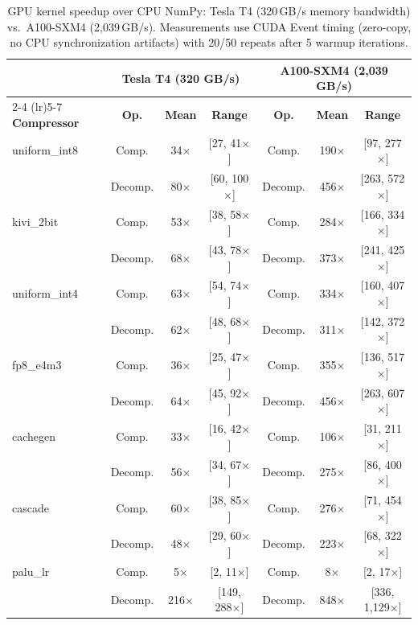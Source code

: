 \documentclass{article}
\begin{document}
\begin{table}[t]
\centering
\caption{GPU kernel speedup over CPU NumPy: Tesla T4 (320\,GB/s memory bandwidth) vs.\ A100-SXM4 (2{,}039\,GB/s). Measurements use CUDA Event timing (zero-copy, no CPU synchronization artifacts) with 20/50 repeats after 5 warmup iterations.}
\label{tab:gpu_speedup}
\small
\begin{tabular}{lcccccc}
\toprule
 & \multicolumn{3}{c}{\textbf{Tesla T4 (320 GB/s)}} & \multicolumn{3}{c}{\textbf{A100-SXM4 (2{,}039 GB/s)}} \\
\cmidrule(lr){2-4} \cmidrule(lr){5-7}
\textbf{Compressor} & \textbf{Op.} & \textbf{Mean} & \textbf{Range} & \textbf{Op.} & \textbf{Mean} & \textbf{Range} \\
\midrule
uniform\_int8 & Comp. & 34$\times$ & [27, 41$\times$] & Comp. & 190$\times$ & [97, 277$\times$] \\
 & Decomp. & 80$\times$ & [60, 100$\times$] & Decomp. & 456$\times$ & [263, 572$\times$] \\
\midrule
kivi\_2bit & Comp. & 53$\times$ & [38, 58$\times$] & Comp. & 284$\times$ & [166, 334$\times$] \\
 & Decomp. & 68$\times$ & [43, 78$\times$] & Decomp. & 373$\times$ & [241, 425$\times$] \\
\midrule
uniform\_int4 & Comp. & 63$\times$ & [54, 74$\times$] & Comp. & 334$\times$ & [160, 407$\times$] \\
 & Decomp. & 62$\times$ & [48, 68$\times$] & Decomp. & 311$\times$ & [142, 372$\times$] \\
\midrule
fp8\_e4m3 & Comp. & 36$\times$ & [25, 47$\times$] & Comp. & 355$\times$ & [136, 517$\times$] \\
 & Decomp. & 64$\times$ & [45, 92$\times$] & Decomp. & 456$\times$ & [263, 607$\times$] \\
\midrule
cachegen & Comp. & 33$\times$ & [16, 42$\times$] & Comp. & 106$\times$ & [31, 211$\times$] \\
 & Decomp. & 56$\times$ & [34, 67$\times$] & Decomp. & 275$\times$ & [86, 400$\times$] \\
\midrule
cascade & Comp. & 60$\times$ & [38, 85$\times$] & Comp. & 276$\times$ & [71, 454$\times$] \\
 & Decomp. & 48$\times$ & [29, 60$\times$] & Decomp. & 223$\times$ & [68, 322$\times$] \\
\midrule
palu\_lr & Comp. & 5$\times$ & [2, 11$\times$] & Comp. & 8$\times$ & [2, 17$\times$] \\
 & Decomp. & 216$\times$ & [149, 288$\times$] & Decomp. & 848$\times$ & [336, 1{,}129$\times$] \\
\bottomrule
\end{tabular}
\end{table}
\end{document}
